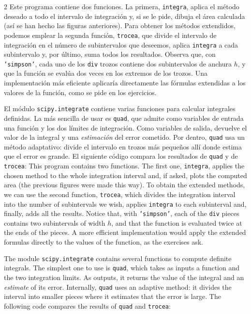 \begin{paracol}{2}
Este programa contiene dos funciones. La primera, \texttt{integra}, aplica el método deseado a todo el intervalo de integración y, si se le pide, dibuja el área calculada (así se han hecho las figuras anteriores). Para obtener los métodos extendidos, podemos emplear la segunda función, \texttt{trocea}, que divide el intervalo de integración en el número de subintervalos que deseemos, aplica \texttt{integra} a cada subintervalo y, por último, suma todos los resultados. Observa que, con \texttt{'simpson'}, cada uno de los \texttt{div} trozos contiene dos subintervalos de anchura $h$, y que la función se evalúa dos veces en los extremos de los trozos. Una implementación más eficiente aplicaría directamente las fórmulas extendidas a los valores de la función, como se pide en los ejercicios.

El módulo \texttt{scipy.integrate} contiene varias funciones para calcular integrales definidas. La más sencilla de usar es \texttt{quad}, que admite como variables de entrada una función y los dos límites de integración. Como variables de salida, devuelve el valor de la integral y una \emph{estimación} del error cometido. Por dentro, \texttt{quad} usa un método adaptativo: divide el intervalo en trozos más pequeños allí donde estima que el error es grande. El siguiente código compara los resultados de \texttt{quad} y de \texttt{trocea}:
\switchcolumn
This program contains two functions. The first one, \texttt{integra}, applies the chosen method to the whole integration interval and, if asked, plots the computed area (the previous figures were made this way). To obtain the extended methods, we can use the second function, \texttt{trocea}, which divides the integration interval into the number of subintervals we wish, applies \texttt{integra} to each subinterval and, finally, adds all the results. Notice that, with \texttt{'simpson'}, each of the \texttt{div} pieces contains two subintervals of width $h$, and that the function is evaluated twice at the ends of the pieces. A more efficient implementation would apply the extended formulas directly to the values of the function, as the exercises ask.

The module \texttt{scipy.integrate} contains several functions to compute definite integrals. The simplest one to use is \texttt{quad}, which takes as inputs a function and the two integration limits. As outputs, it returns the value of the integral and an \emph{estimate} of its error. Internally, \texttt{quad} uses an adaptive method: it divides the interval into smaller pieces where it estimates that the error is large. The following code compares the results of \texttt{quad} and \texttt{trocea}:
\end{paracol}

